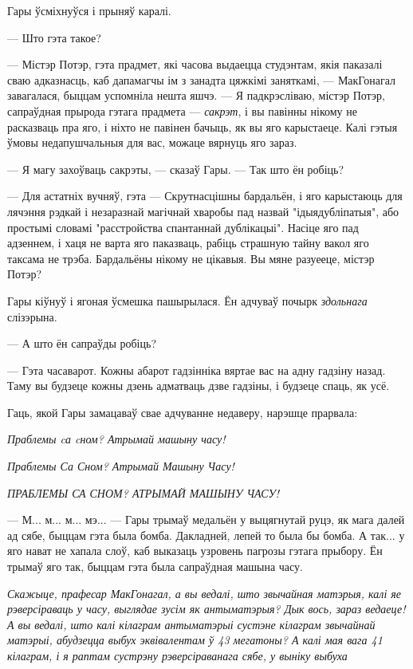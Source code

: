 Гары ўсміхнуўся і прыняў каралі. 

--- Што гэта такое?

--- Містэр Потэр, гэта прадмет, які часова выдаецца студэнтам, якія паказалі
сваю адказнасць, каб дапамагчы ім з занадта цяжкімі заняткамі, --- МакГонагал завагалася,
быццам успомніла нешта яшчэ. --- Я падкрэсліваю, містэр Потэр, сапраўдная прырода гэтага 
прадмета --- \emph{сакрэт}, і вы павінны нікому не расказваць пра яго, і ніхто не 
павінен бачыць, як вы яго карыстаеце. Калі гэтыя ўмовы недапушчальныя для вас, можаце
вярнуць яго зараз.

--- Я магу захоўваць сакрэты, --- сказаў Гары. --- Так што ён робіць?

--- Для астатніх вучняў, гэта --- Скрутнасцішны бардальён, і яго карыстаюць для 
лячэння рэдкай і незаразнай магічнай хваробы пад назвай "ідыядубліпатыя",
або простымі словамі "расстройства спантаннай дублікацыі".
Насіце яго пад адзеннем, і хаця не варта яго паказваць, рабіць страшную 
тайну вакол яго таксама не трэба. Бардальёны нікому не цікавыя. Вы мяне разуееце, 
містэр Потэр?

Гары кіўнуў і ягоная ўсмешка пашырылася. Ён адчуваў почырк \emph{здольнага}
слізэрына. 

--- А што ён сапраўды робіць?

--- Гэта часаварот. Кожны абарот гадзінніка вяртае вас на адну гадзіну назад. 
Таму вы будзеце кожны дзень адматваць дзве гадзіны, і будзеце спаць, як усё.

Гаць, якой Гары замацаваў свае адчуванне недаверу, нарэшце прарвала:

\emph{Праблемы cа cном? Атрымай машыну часу!}

\emph{Праблемы Са Сном? Атрымай Машыну Часу!}

\emph{ПРАБЛЕМЫ СА СНОМ? АТРЫМАЙ МАШЫНУ ЧАСУ!}

--- М... м... м... мэ... --- Гары трымаў 
медальён у выцягнутай руцэ, як мага далей ад сябе, быццам гэта была бомба. Дакладней,
лепей то была бы бомба. А так... у яго нават не хапала слоў, каб выказаць 
узровень пагрозы гэтага прыбору. Ён трымаў яго так, быццам гэта была сапраўдная 
машына часу.

\emph{Скажыце, прафесар МакГонагал, а вы ведалі, што звычайная матэрыя, калі яе 
рэверсіраваць у часу, выглядае зусім як антыматэрыя? Дык вось, зараз ведаеце!
А вы ведалі, што калі кілаграм антыматэрыі сустэне кілаграм звычайнай матэрыі,
абудзецца выбух эквівалентам ў 43 мегатоны? А калі мая вага 41 кілаграм, і я раптам
сустрэну рэверсіраванага сябе, у выніку выбуха }

